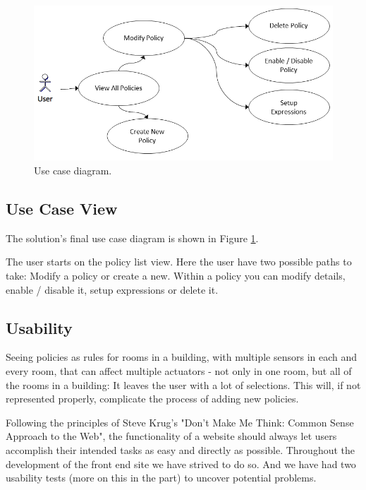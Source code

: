 \begin{figure}[ht]
\centering
\includegraphics[width=\linewidth]{use-case-diagram.png}
\caption{Use case diagram.}
\label{fig:usecasediagram}
\end{figure}


\subsection{Use Case View}
The solution's final use case diagram is shown in Figure \ref{fig:usecasediagram}.

The user starts on the policy list view. Here the user have two possible paths to take: Modify a policy or create a new. Within a policy you can modify details, enable / disable it, setup expressions or delete it.  

\subsection{Usability}
Seeing policies as rules for rooms in a building, with multiple sensors in each and every room, that can affect multiple actuators - not only in one room, but all of the rooms in a building: It leaves the user with a lot of selections. 
This will, if not represented properly, complicate the process of adding new policies.

Following the principles of Steve Krug's "Don't Make Me Think: Common Sense Approach to the Web"\cite{Krug:2005:DMM:1051204}, the functionality of a website should always let users accomplish their intended tasks as easy and directly as possible.
Throughout the development of the front end site we have strived to do so. And we have had two usability tests (more on this in the  part) to uncover potential problems.

